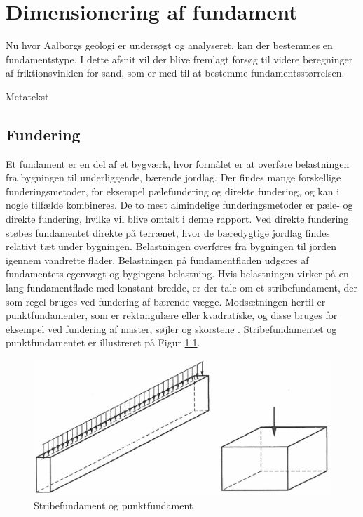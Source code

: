 \chapter{Dimensionering af fundament}
Nu hvor Aalborgs geologi er undersøgt og analyseret, kan der bestemmes en fundamentstype. I dette afsnit vil der blive fremlagt forsøg til videre beregninger af friktionsvinklen for sand, som er med til at bestemme fundamentsstørrelsen.  

Metatekst
\section{Fundering}
Et fundament er en del af et bygværk, hvor formålet er at overføre belastningen fra bygningen til underliggende, bærende jordlag. Der findes mange forskellige funderingsmetoder, for eksempel pælefundering og direkte fundering, og kan i nogle tilfælde kombineres. De to mest almindelige funderingsmetoder er pæle- og direkte fundering, hvilke vil blive omtalt i denne rapport.
\newline \indent{     }  Ved direkte fundering støbes fundamentet direkte på terrænet, hvor de bæredygtige jordlag findes relativt tæt under bygningen. Belastningen overføres fra bygningen til jorden igennem vandrette flader. Belastningen på fundamentfladen udgøres af fundamentets egenvægt og bygingens belastning. Hvis belastningen virker på en lang fundamentflade med konstant bredde, er der tale om et stribefundament, der som regel bruges ved fundering af bærende vægge. Modsætningen hertil er punktfundamenter, som er rektangulære eller kvadratiske, og disse bruges for eksempel ved fundering af master, søjler og skorstene \citep[ s. 221]{geoteknik}. Stribefundamentet og punktfundamentet er illustreret på Figur \ref{fig:fundament}. 

\begin{figure}[htbp] \centering
	\begin{minipage}[b]{0.48\textwidth}\centering
		\includegraphics[width=1.0\textwidth]{billeder/fundament.png}
		\caption{Stribefundament og punktfundament \citep[ s. 221]{geoteknik}}
		\label{fig:fundament}
	\end{minipage}\hfill
\end{figure}

